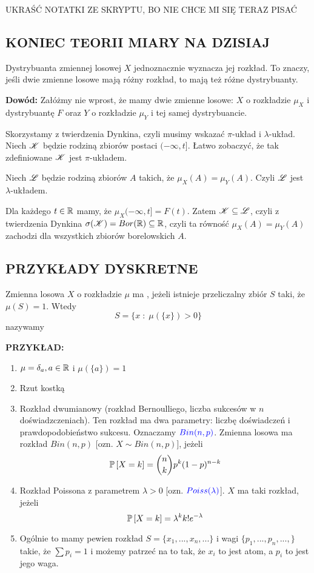 {\large\color{orange}UKRAŚĆ NOTATKI ZE SKRYPTU, BO NIE CHCE MI SIĘ TERAZ PISAĆ}


\subsection{KONIEC TEORII MIARY NA DZISIAJ}

\begin{tw}
Dystrybuanta zmiennej losowej $X$ jednoznacznie wyznacza jej rozkład. To znaczy, jeśli dwie zmienne losowe mają różny rozkład, to mają też różne dystrybuanty.
\end{tw}

\textbf{Dowód:} Załóżmy nie wprost, że mamy dwie zmienne losowe: $X$ o rozkładzie $\mu_X$ i dystrybuantę $F$ oraz $Y$ o rozkładzie $\mu_Y$ i tej samej dystrybuancie. 

Skorzystamy z twierdzenia Dynkina, czyli musimy wskazać $\pi$-układ i $\lambda$-układ. Niech $\mathcal{K}$ będzie rodziną zbiorów postaci $(-\infty, t]$. Łatwo zobaczyć, że tak zdefiniowane $\mathcal{K}$ jest $\pi$-układem.

Niech $\mathcal{L}$ będzie rodziną zbiorów $A$ takich, że $\mu_X(A)=\mu_Y(A)$. Czyli $\mathcal{L}$ jest $\lambda$-układem.

Dla każdego $t\in\mathbb{R}$ mamy, że $\mu_X(-\infty,t]=F(t)$.
Zatem $\mathcal{K}\subseteq\mathcal{L}$, czyli z twierdzenia Dynkina $\sigma(\mathcal{K})=Bor(\mathbb{R})\subseteq\mathbb{R}$, czyli ta równość $\mu_X(A)=\mu_Y(A)$ zachodzi dla wszystkich zbiorów borelowskich $A$.


\subsection{PRZYKŁADY DYSKRETNE}
\begin{definicja}
Zmienna losowa $X$ o rozkładzie $\mu$ ma , jeżeli istnieje przeliczalny zbiór $S$ taki, że $\mu(S)=1$. Wtedy
$$S=\{x\;:\;\mu(\{x\})>0\}$$
nazywamy 
\end{definicja}

\textbf{PRZYKŁAD:}
\begin{enumerate}
    \item $\mu=\delta_a,a\in\mathbb{R}$ i $\mu(\{a\})=1$
    \item Rzut kostką
    \item Rozkład dwumianowy (rozkład Bernoulliego, liczba sukcesów w $n$ doświadzczeniach). Ten rozkład ma dwa parametry: liczbę doświadczeń i prawdopodobieństwo sukcesu. Oznaczamy $\color{blue}Bin(n,p)$. Zmienna losowa ma rozkład $Bin(n,p)$ [ozn. $X\sim Bin(n,p)$], jeżeli
    $$\mathbb{P}\left[X=k\right]={n\choose k}p^k(1-p)^{n-k}$$
    \item Rozkład Poissona z parametrem $\lambda>0$ [ozn. $\color{blue} Poiss(\lambda)$]. $X$ ma taki rozkład, jeżeli
    $$\mathbb{P}\left[X=k\right]=\lambda^kk!e^{-\lambda}$$
    \item Ogólnie to mamy pewien rozkład $S=\{x_1,...,x_n,...\}$ i wagi $\{p_1,...,p_n,...,\}$ takie, że $\sum p_i=1$ i możemy patrzeć na to tak, że $x_i$ to jest atom, a $p_i$ to jest jego waga.
\end{enumerate}

